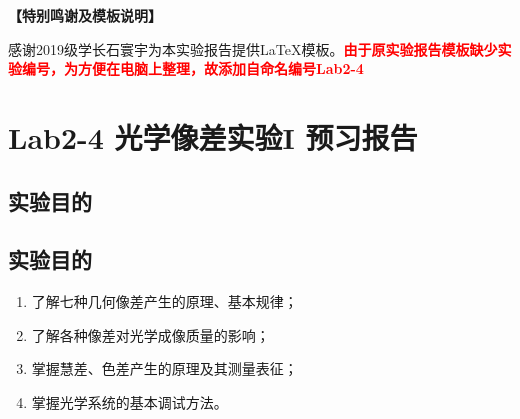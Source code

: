 \documentclass[dvipsnames, svgnames,a4paper,11pt]{article}
\begin{document}
	\textbf{【特别鸣谢及模板说明】}	
	
	感谢2019级学长石寰宇为本实验报告提供\LaTeX 模板。\textcolor{red}{\textbf{由于原实验报告模板缺少实验编号，为方便在电脑上整理，故添加自命名编号Lab2-4}}
	
	
	
	\clearpage
	\tableofcontents
	\clearpage
	
	
	
	
	\setcounter{section}{0}
	\section{Lab2-4 光学像差实验I \quad\heiti 预习报告}
	
	\subsection{实验目的}
	\subsection{实验目的}
	\begin{enumerate}
		\item 了解七种几何像差产生的原理、基本规律；
		\item 了解各种像差对光学成像质量的影响；
		\item 掌握慧差、色差产生的原理及其测量表征； 
		\item 掌握光学系统的基本调试方法。
	\end{enumerate}
	
\end{document}
